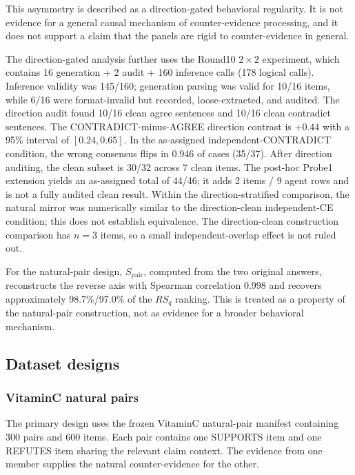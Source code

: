 \documentclass[11pt]{article}
\begin{document}
This asymmetry is described as a direction-gated behavioral regularity. It is not evidence for a general causal mechanism of counter-evidence processing, and it does not support a claim that the panels are rigid to counter-evidence in general.

The direction-gated analysis further uses the Round10 \(2\times2\) experiment, which contains 16 generation + 2 audit + 160 inference calls (178 logical calls). Inference validity was 145/160; generation parsing was valid for 10/16 items, while 6/16 were format-invalid but recorded, loose-extracted, and audited. The direction audit found 10/16 clean agree sentences and 10/16 clean contradict sentences. The CONTRADICT-minus-AGREE direction contrast is \(+0.44\) with a 95\% interval of \([0.24,0.65]\). In the as-assigned independent-CONTRADICT condition, the wrong consensus flips in 0.946 of cases (35/37). After direction auditing, the clean subset is 30/32 across 7 clean items. The post-hoc Probe1 extension yields an as-assigned total of 44/46; it adds 2 items / 9 agent rows and is not a fully audited clean result. Within the direction-stratified comparison, the natural mirror was numerically similar to the direction-clean independent-CE condition; this does not establish equivalence. The direction-clean construction comparison has \(n=3\) items, so a small independent-overlap effect is not ruled out.

For the natural-pair design, \(S_{\mathrm{pair}}\), computed from the two original answers, reconstructs the reverse axis with Spearman correlation 0.998 and recovers approximately 98.7\%/97.0\% of the \(RS_q\) ranking. This is treated as a property of the natural-pair construction, not as evidence for a broader behavioral mechanism.

\subsection{Dataset designs}

\subsubsection{VitaminC natural pairs}

The primary design uses the frozen VitaminC natural-pair manifest containing 300 pairs and 600 items. Each pair contains one SUPPORTS item and one REFUTES item sharing the relevant claim context. The evidence from one member supplies the natural counter-evidence for the other.
\end{document}
